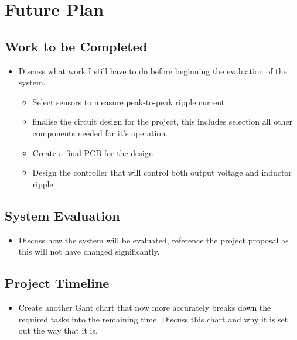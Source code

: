 \chapter{Future Plan}\label{C:future} 

\section{Work to be Completed}

\begin{itemize}

    \item 
    Discuss what work I still have to do before beginning the evaluation of the system. 

    \begin{itemize}
        \item Select sensors to measure peak-to-peak ripple current
        \item finalise the circuit design for the project, this includes selection all other components needed for it's operation.
        \item Create a final PCB for the design 
        \item Design the controller that will control both output voltage and inductor ripple 
    \end{itemize}

\end{itemize}

\section{System Evaluation}

\begin{itemize}

    \item 
    Discuss how the system will be evaluated, reference the project proposal as this will not have changed significantly.  

\end{itemize}

\section{Project Timeline}

\begin{itemize}

    \item 
    Create another Gant chart that now more accurately breaks down the required tasks into the remaining time. Discuss this chart and why it is set out the way that it is. 

\end{itemize}



